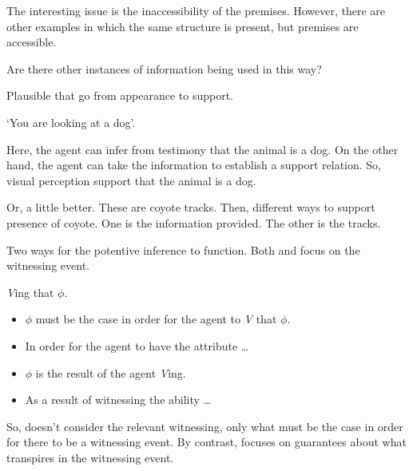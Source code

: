 \begin{note}
  The interesting issue is the inaccessibility of the premises.
  However, there are other examples in which the same structure is present, but premises are accessible.
  
  Are there other instances of information being used in this way?

  Plausible that go from appearance to support.

  `You are looking at a dog'.

  Here, the agent can infer from testimony that the animal is a dog.
  On the other hand, the agent can take the information to establish a support relation.
  So, visual perception support that the animal is a dog.

  Or, a little better.
  These are coyote tracks.
  Then, different ways to support presence of coyote.
  One is the information provided.
  The other is the tracks.
\end{note}

\begin{note}
  Two ways for the potentive inference to function.
  Both \AR{} and \WR{} focus on the witnessing event.

  \emph{V}ing that \(\phi\).
  \begin{itemize}
  \item \(\phi\) must be the case in order for the agent to \emph{V} that \(\phi\).
  \item In order for the agent to have the attribute \dots
  \item \(\phi\) is the result of the agent \emph{V}ing.
  \item As a result of witnessing the ability \dots
  \end{itemize}

  So, \AR{} doesn't consider the relevant witnessing, only what must be the case in order for there to be a witnessing event.
  By contrast, \WR{} focuses on guarantees about what transpires in the witnessing event.
\end{note}

\subsection{\AR{}}
\label{sec:ar}



\subsection{\WR{}}
\label{sec:wr}

